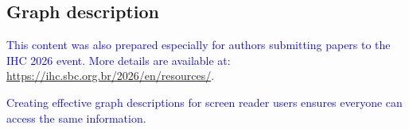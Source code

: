 \documentclass[12pt]{article}
\begin{document}

\subsection{Graph description}  

\textcolor{blue}{This content was also prepared especially for authors submitting papers to the IHC 2026 event. More details are available at: \url{https://ihc.sbc.org.br/2026/en/resources/}.}

 \textcolor{blue}{Creating effective graph descriptions for screen reader users ensures everyone can access the same information.}
\end{document}
